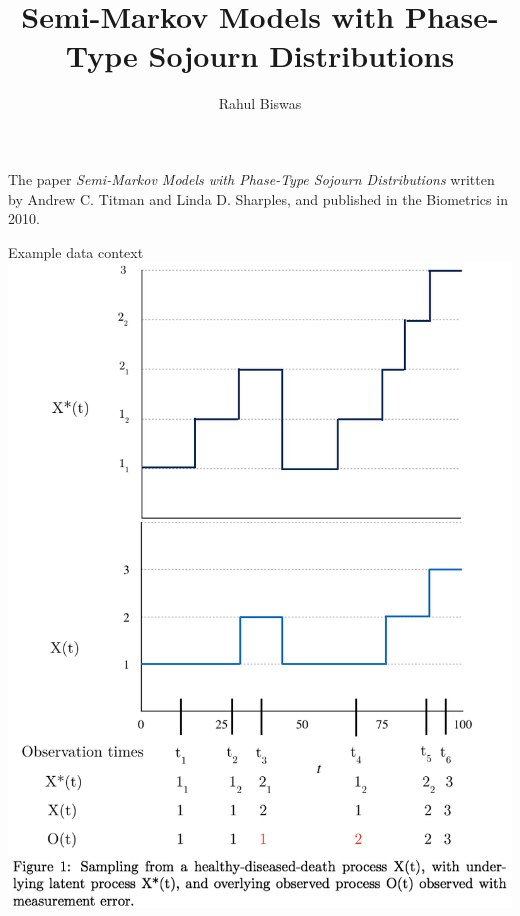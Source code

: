 \documentclass{beamer}
\date{}
\title{Semi-Markov Models with Phase-Type Sojourn Distributions}
\author{Rahul Biswas}
\institute{Department of Statistics, University of Washington, Seattle}
\begin{document}
\maketitle
\begin{frame}{The paper}
\textit{Semi-Markov Models with Phase-Type Sojourn Distributions} written by Andrew C. Titman and Linda D. Sharples, and published in the Biometrics in 2010.
\end{frame}
\begin{frame}{Example data context}
\includegraphics[scale=0.41]{figprocessAndsampling5.png}
\hspace{3mm}

\end{frame}
\end{document}
